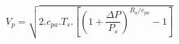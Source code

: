 \[
V_p = \sqrt{2.c_{pa}.T_s.
        \left[ \left(1+\frac{\Delta P}{P_s}\right)^{R_a/c_{pa} } -1 \right] }
\]

